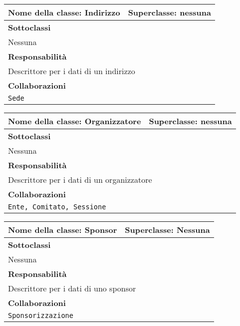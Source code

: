 \begin{table}[h!]
\centering
\begin{tabular}{|l|l|}
\hline
\textbf{Nome della classe:} Indirizzo & \textbf{Superclasse}: nessuna \\ \hline
\multicolumn{2}{|l|}{\textbf{Sottoclassi}}\\
\multicolumn{2}{|l|}{Nessuna} \\ \hline
\multicolumn{2}{|l|}{\textbf{Responsabilità}}\\
\multicolumn{2}{|l|}{Descrittore per i dati di un indirizzo} \\ \hline
\multicolumn{2}{|l|}{\textbf{Collaborazioni}}\\
\multicolumn{2}{|l|}{\texttt{Sede}} \\ \hline
\end{tabular}
\end{table}

\begin{table}[h!]
\centering
\begin{tabular}{|l|l|}
\hline
\textbf{Nome della classe:} Organizzatore & \textbf{Superclasse}: nessuna \\ \hline
\multicolumn{2}{|l|}{\textbf{Sottoclassi}}\\
\multicolumn{2}{|l|}{Nessuna} \\ \hline
\multicolumn{2}{|l|}{\textbf{Responsabilità}}\\
\multicolumn{2}{|l|}{Descrittore per i dati di un organizzatore} \\ \hline
\multicolumn{2}{|l|}{\textbf{Collaborazioni}}\\
\multicolumn{2}{|l|}{\texttt{Ente, Comitato, Sessione}} \\ \hline
\end{tabular}
\end{table}

\begin{table}[h!]
\centering
\begin{tabular}{|l|l|}
\hline
\textbf{Nome della classe:} Sponsor & \textbf{Superclasse}: Nessuna \\ \hline
\multicolumn{2}{|l|}{\textbf{Sottoclassi}}\\
\multicolumn{2}{|l|}{Nessuna} \\ \hline
\multicolumn{2}{|l|}{\textbf{Responsabilità}}\\
\multicolumn{2}{|l|}{Descrittore per i dati di uno sponsor} \\ \hline
\multicolumn{2}{|l|}{\textbf{Collaborazioni}}\\
\multicolumn{2}{|l|}{\texttt{Sponsorizzazione}} \\ \hline
\end{tabular}
\end{table}

